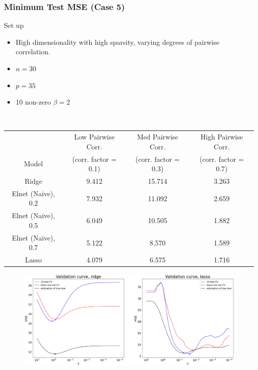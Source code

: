 \begin{frame}[fragile]
\frametitle{Minimum Test MSE (Case 5)}

\begin{block}{Set up}
    \begin{itemize}
        \item High dimensionality with high sparsity, varying degrees of pairwise correlation.  
        \item $n = 30$
        \item $p = 35$
        \item 10 non-zero $\beta = 2$
    \end{itemize}
\end{block} \\

\begin{center}
    
    \begin{tabular}{||c c c c||} 
         \hline
          & Low Pairwise Corr. & Med Pairwise Corr. & High Pairwise Corr. \\ [0.5ex] 
          Model & (corr. factor = 0.1) & (corr. factor = 0.3) & (corr. factor = 0.7)\\ [0.5ex]
         \hline\hline
         Ridge & 9.412 & 15.714 & 3.263\\ 
         \hline
         Elnet (Naive), 0.2 & 7.932 & 11.092 & 2.659\\
         \hline
         Elnet (Naive), 0.5 & 6.049 & 10.505 & 1.882\\
        \hline
         Elnet (Naive), 0.7 & 5.122 & 8.570 & \cellcolor{pink!60}1.589 \\
        \hline
         Lasso & \cellcolor{pink!60}4.079 & \cellcolor{pink!60}6.575 & 1.716 \\
        \hline
    \end{tabular}

\end{center}
\end{frame}
\begin{frame}[fragile]
        \begin{figure}[b]
        \includegraphics[scale=0.27]{Img/CV_simulation.png}%
        \centering
    \end{figure}
\end{frame}

